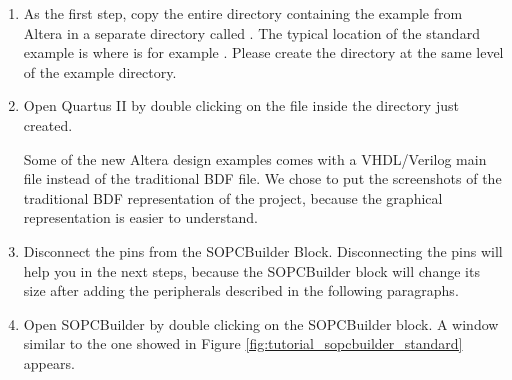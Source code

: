 \begin{enumerate}
\item As the first step, copy the entire directory containing the
   example from Altera in a separate directory called
  . The typical location of the standard example
  is
  where  is for example
  . Please create the directory
   at the same level of the 
  example directory.



\item Open Quartus II by double clicking on the 
  file inside the  directory just created.

\begin{note}
  Some of the new Altera design examples comes with a VHDL/Verilog
  main file instead of the traditional BDF file. We chose to put the
  screenshots of the traditional BDF representation of the project,
  because the graphical representation is easier to understand.
\end{note}



\item Disconnect the pins from the SOPCBuilder Block. Disconnecting the pins
  will help you in the next steps, because the SOPCBuilder block will
  change its size after adding the peripherals described in the
  following paragraphs.


\item Open SOPCBuilder by double clicking on the SOPCBuilder block. A
  window similar to the one showed in Figure
  \ref{fig:tutorial_sopcbuilder_standard} appears.
%
\begin{figure}


\end{figure}
\end{enumerate}
